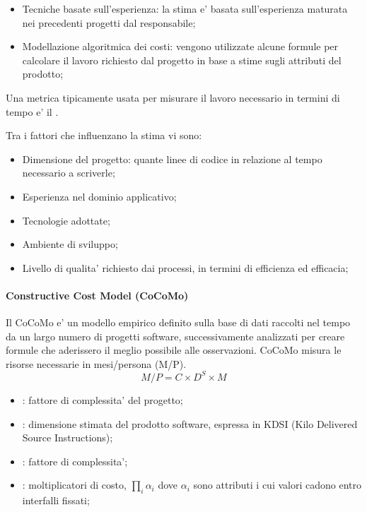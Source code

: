 \begin{itemize}
	\item Tecniche basate sull'esperienza: la stima e' basata sull'esperienza maturata nei precedenti progetti dal responsabile;
	\item Modellazione algoritmica dei costi: vengono utilizzate alcune formule per calcolare il lavoro richiesto dal progetto in base a stime sugli attributi del prodotto;
\end{itemize}

Una \gls{metrica} tipicamente usata per misurare il lavoro necessario in termini di tempo e' il .

Tra i fattori che influenzano la stima vi sono:
\begin{itemize}
        \item Dimensione del progetto: quante linee di codice in relazione al tempo necessario a scriverle;
        \item Esperienza nel dominio applicativo;
        \item Tecnologie adottate;
        \item Ambiente di sviluppo;
        \item Livello di qualita' richiesto dai processi, in termini di efficienza ed efficacia;
\end{itemize}

\paragraph{Constructive Cost Model (CoCoMo)}
Il CoCoMo e' un modello empirico definito sulla base di dati raccolti nel tempo da un largo numero di progetti software, successivamente analizzati per creare formule che aderissero il meglio possibile alle osservazioni. CoCoMo misura le risorse necessarie in mesi/persona (M/P).
\[
        M/P = C \times D^S \times M
\]
\begin{itemize}
	\item {}: fattore di complessita' del progetto;
	\item {}: dimensione stimata del prodotto software, espressa in KDSI (Kilo Delivered Source Instructions);
	\item {}: fattore di complessita';
	\item {}: moltiplicatori di costo, $\prod_i \alpha_i$ dove $\alpha_i$ sono attributi i cui valori cadono entro interfalli fissati;
\end{itemize}

